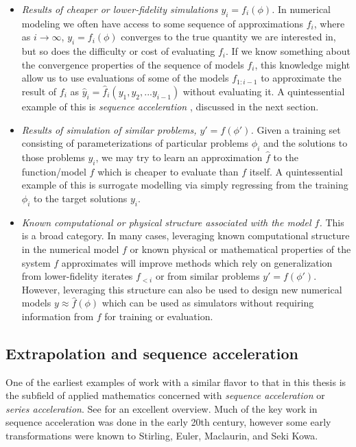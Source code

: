 \documentclass{puthesis}
\begin{document}
\begin{itemize}
  \item \emph{Results of cheaper or lower-fidelity simulations $y_i = f_i(\phi)$.}
  In numerical modeling we often have access to some sequence of approximations $f_i$,
  where as $i \to \infty$, $y_i = f_i(\phi)$ converges to the true quantity we are
  interested in, but so does the difficulty or cost of evaluating $f_i$.
  If we know something about the convergence properties of the sequence of models $f_i$,
  this knowledge might allow us to use evaluations of some of the
  models $f_{1:i-1}$ to approximate the result of $f_i$ as
  $\hat{y}_i = \hat{f}_i(y_1, y_2, ... y_{i-1})$ without evaluating it.
  A quintessential example of this is \emph{sequence acceleration}
  \citep{osada1991acceleration}, discussed in the
  next section. \\
  \item \emph{Results of simulation of similar problems, $y' = f(\phi')$.}
  Given a training set consisting of parameterizations of particular problems $\phi_i$
  and the solutions to those problems $y_i$, we may try to learn an approximation
  $\hat{f}$ to the function/model $f$ which is cheaper to evaluate than $f$ itself.
  A quintessential example of this is surrogate modelling via simply regressing from the
  training $\phi_i$ to the target solutions $y_i$.\\
  \item \emph{Known computational or physical structure associated with the
  model $f$.} This is a broad category.
  In many cases, leveraging known computational
  structure in the numerical model $f$ or known physical or mathematical properties of
  the system $f$ approximates will improve methods which rely on generalization from
  lower-fidelity iterates $f_{<i}$ or from similar problems $y' = f(\phi')$.
  However, leveraging this structure can also be used to design new numerical models
  $y \approx \hat{f}(\phi)$ which can be used as simulators without requiring information from
  $f$ for training or evaluation.
\end{itemize}

\subsection{Extrapolation and sequence acceleration}
One of the earliest examples of work with a similar flavor to that in this thesis
is the subfield of applied mathematics concerned with \emph{sequence acceleration} or
\emph{series acceleration}.
See \citet{osada1991acceleration} for an excellent overview.
Much of the key work in sequence acceleration was done in the early 20th century, however some early transformations were known to Stirling, Euler,
Maclaurin, and Seki Kowa.
\end{document}
